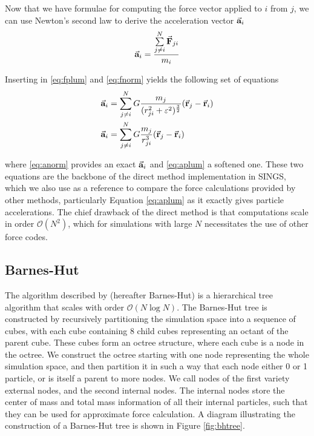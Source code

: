 \documentclass[12pt, twoside, letterpaper]{article}
\begin{document}
Now that we have formulae for computing the force vector applied to $i$ from $j$, we can use Newton's second law to derive the acceleration vector $\va{a}_i$
\begin{equation} \label{eq:\theequation}
\va{a}_i = \dfrac{\sum_{j \neq i}^N \limits \va{F}_{ji}}{m_i}
\end{equation}

\noindent Inserting in \eqref{eq:fplum} and \eqref{eq:fnorm} yields the following set of equations
\begin{subequations} \label{eq:\theequation}
    \begin{align}
		& \va{a}_i = \sum_{j \neq i}^{N} G \dfrac{m_j}{(r_{ji}^2 + \varepsilon^2)^\frac{3}{2}} (\va{r}_j - \va{r}_i) \label{eq:aplum} \\
		& \va{a}_i = \sum_{j \neq i}^{N} G \dfrac{m_j}{r_{ji}^3} (\va{r}_j - \va{r}_i) \label{eq:anorm}
    \end{align}
\end{subequations}

\noindent where \eqref{eq:anorm} provides an exact $\va{a}_i$ and \eqref{eq:aplum} a softened one. These two equations are the backbone of the direct method implementation in SINGS, which we also use as a reference to compare the force calculations provided by other methods, particularly Equation \eqref{eq:aplum} as it exactly gives particle accelerations. The chief drawback of the direct method is that computations scale in order $\mathcal{O}(N^2)$, which for simulations with large $N$ necessitates the use of other force codes.

\subsection{Barnes-Hut} \label{subsec:bh}
The algorithm described by \citet{barnes1986hierarchical} (hereafter Barnes-Hut) is a hierarchical tree algorithm that scales with order $\mathcal{O}(N\log N)$. The Barnes-Hut tree is constructed by recursively partitioning the simulation space into a sequence of cubes, with each cube containing 8 child cubes representing an octant of the parent cube. These cubes form an octree structure, where each cube is a node in the octree. We construct the octree starting with one node representing the whole simulation space, and then partition it in such a way that each node either 0 or 1 particle, or is itself a parent to more nodes. We call nodes of the first variety external nodes, and the second internal nodes. The internal nodes store the center of mass and total mass information of all their internal particles, such that they can be used for approximate force calculation. A diagram illustrating the construction of a Barnes-Hut tree is shown in Figure \ref{fig:bhtree}.
\end{document}
